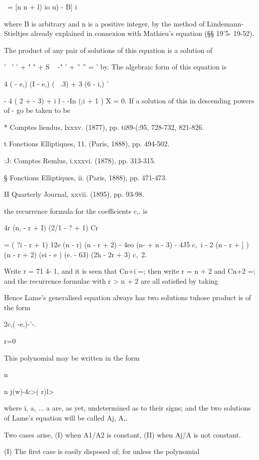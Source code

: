 {{{{{{{{ \ = [n n + l) io u) - B] i\,

where B is arbitrary and n is a positive integer, by the method of
Lindemann- Stieltjes already explained in connexion with Mathieu's
equation (§§ 19'5- 19-52).

The product of any pair of solutions of this equation is a solution of

'~ ' ' + " " + S ~ -" ' + '' '' = ' by. The algebraic form of
this equation is

4 ( - e,) (I - e,) ( \ .3) + 3 (6 - i,) '

- 4 ( 2 + - 3) + i l - -In (;i + 1 ) X = 0. If a solution of this in
descending powers of - go be taken to be

* Comptes liendus, lxxxv. (1877), pp. ti89-(;95, 728-732, 821-826.

t Fonctions Elliptiques, 11. (Paris, 1888), pp. 494-502.

:J: Comptes Remlus, i.xxxvi. (1878), pp. 313-315.

§ Fonctions Elliptiques, ii. (Paris, 1888), pp. 471-473.

II Quarterly Journal, xxvii. (1895), pp. 93-98.

%
%

the recurrence formula for the coefficients c,. is

4r (n, - r + I) (2/1 - ? + 1) Cr

= ( ?i - r + 1) 12e (n - r) (n - r + 2) - 4eo (n- + n - 3) - 4J5 c,\ i
- 2 (n - r + ] ) (n - r + 2) (ei - e ) (e. - 63) (2h - 2r + 3) c,\ 2.

Write r = 71 4- 1, and it is seen that Cn+i =; then write r = n + 2
and Cn+2 =; and the recurrence formulae with r > n + 2 are all
satisfied by taking

Hence Lame's generalised equation always has two solutions tuhose
product is of the form

2c,( -e,)-'-.

r=0

This polynomial may be written in the form

n

n j(w)-\&>( r)l>

where i, a, ... a are, as yet, undetermined as to their signs; and
the two solutions of Lame's equation will be called Aj, A,.

Two cases arise, (I) when A1/A2 is constant, (II) when Aj/A is not
constant.

(I) The first case is easily disposed of; for unless the polynomial

}}}}}}}}
